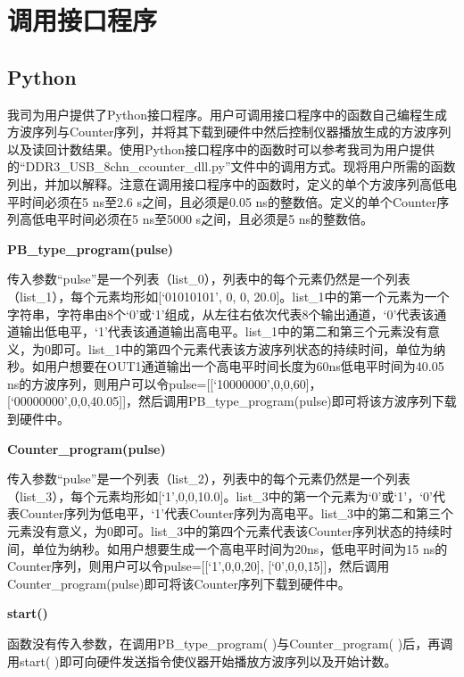 \chapter{\heiti 调用接口程序}
\section{Python }
我司为用户提供了Python接口程序。用户可调用接口程序中的函数自己编程生成方波序列与Counter序列，并将其下载到硬件中然后控制仪器播放生成的方波序列以及读回计数结果。使用Python接口程序中的函数时可以参考我司为用户提供的“DDR3\_USB\_8chn\_ccounter\_dll.py”文件中的调用方式。现将用户所需的函数列出，并加以解释。注意在调用接口程序中的函数时，定义的单个方波序列高低电平时间必须在5 ns至2.6 s之间，且必须是0.05 ns的整数倍。定义的单个Counter序列高低电平时间必须在5 ns至5000 s之间，且必须是5 ns的整数倍。
\vspace{0.4cm}

\noindent\fontsize{12pt}{\baselineskip}\textbf{PB\_type\_program(pulse)}

传入参数“pulse”是一个列表（list\_0），列表中的每个元素仍然是一个列表（list\_1），每个元素均形如[‘01010101’, 0, 0, 20.0]。list\_1中的第一个元素为一个字符串，字符串由8个‘0’或‘1’组成，从左往右依次代表8个输出通道，‘0’代表该通道输出低电平，‘1’代表该通道输出高电平。list\_1中的第二和第三个元素没有意义，为0即可。list\_1中的第四个元素代表该方波序列状态的持续时间，单位为纳秒。如用户想要在OUT1通道输出一个高电平时间长度为60ns低电平时间为40.05 ns的方波序列，则用户可以令pulse=[[‘10000000’,0,0,60]， [‘00000000’,0,0,40.05]]，然后调用PB\_type\_program(pulse)即可将该方波序列下载到硬件中。
\vspace{0.4cm}

\noindent\fontsize{12pt}{\baselineskip}\textbf{Counter\_program(pulse)}

传入参数“pulse”是一个列表（list\_2），列表中的每个元素仍然是一个列表（list\_3），每个元素均形如[‘1’,0,0,10.0]。list\_3中的第一个元素为‘0’或‘1’，‘0’代表Counter序列为低电平，‘1’代表Counter序列为高电平。list\_3中的第二和第三个元素没有意义，为0即可。list\_3中的第四个元素代表该Counter序列状态的持续时间，单位为纳秒。如用户想要生成一个高电平时间为20ns，低电平时间为15 ns的Counter序列，则用户可以令pulse=[[‘1’,0,0,20], [‘0’,0,0,15]]，然后调用Counter\_program(pulse)即可将该Counter序列下载到硬件中。

\newpage
\noindent\fontsize{12pt}{\baselineskip}\textbf{start()}

函数没有传入参数，在调用PB\_type\_program( )与Counter\_program( )后，再调用start( )即可向硬件发送指令使仪器开始播放方波序列以及开始计数。
\vspace{0.4cm}

